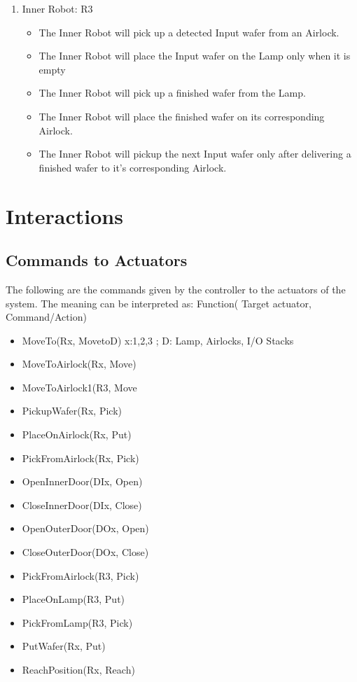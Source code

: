 \documentclass[a4paper,12pt]{article}
\begin{document}
\begin{enumerate}
\item Inner Robot: R3
	\begin{itemize}
	\item The Inner Robot will pick up a detected Input wafer from an Airlock.
	\item The Inner Robot will place the Input wafer on the Lamp only when it is empty
	\item The Inner Robot will pick up a finished wafer from the Lamp.
	\item The Inner Robot will place the finished wafer on its corresponding Airlock.
	\item The Inner Robot will pickup the next Input wafer only after delivering a finished wafer to it's corresponding Airlock.
	\end{itemize}

\end{enumerate}


\section{Interactions} 
\subsection {Commands to Actuators}
The following are the commands given by the controller to the actuators of the system. The meaning can be interpreted as:
Function( Target actuator, Command/Action)
\begin{itemize}
\item MoveTo(Rx, MovetoD)                   x:1,2,3 ; D: Lamp, Airlocks, I/O Stacks
\item MoveToAirlock(Rx, Move)
\item MoveToAirlock1(R3, Move
\item PickupWafer(Rx, Pick)
\item PlaceOnAirlock(Rx, Put)
\item PickFromAirlock(Rx, Pick)
\item OpenInnerDoor(DIx, Open)
\item CloseInnerDoor(DIx, Close)
\item OpenOuterDoor(DOx, Open)
\item CloseOuterDoor(DOx, Close)
\item PickFromAirlock(R3, Pick)
\item PlaceOnLamp(R3, Put)
\item PickFromLamp(R3, Pick)
\item PutWafer(Rx, Put)
\item ReachPosition(Rx, Reach)            
\end{itemize}
\end{document}
